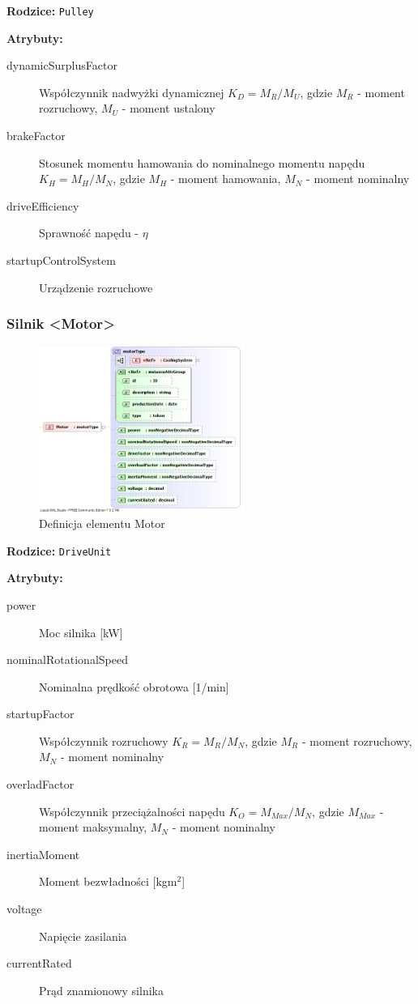 \documentclass[12pt,a4paper]{article}
\begin{document}
\noindent\textbf{Rodzice:} \texttt{Pulley}

\noindent\textbf{Atrybuty:}
\begin{description}
\item[dynamicSurplusFactor] Współczynnik nadwyżki dynamicznej $K_D = M_R/M_U$,
  gdzie $M_R$ - moment rozruchowy, $M_U$ - moment ustalony
\item[brakeFactor] Stosunek momentu hamowania do nominalnego momentu napędu $K_H
  = M_H/M_N$, gdzie $M_H$ - moment hamowania, $M_N$ - moment nominalny
\item[driveEfficiency] Sprawność napędu - $\eta$
\item[startupControlSystem] Urządzenie rozruchowe
\end{description}

\subsubsection{Silnik <Motor>}

\begin{figure}[H]
  \centering
  \includegraphics[width=0.6\textwidth]{png/liquid/Motor}
  \caption{Definicja elementu Motor}
  \label{fig:motor-xsd}
\end{figure}

\noindent\textbf{Rodzice:} \texttt{DriveUnit}

\noindent\textbf{Atrybuty:}
\begin{description}
\item[power] Moc silnika [kW]
\item[nominalRotationalSpeed] Nominalna prędkość obrotowa [1/min]
\item[startupFactor] Współczynnik rozruchowy $K_R = M_R/M_N$,
	gdzie $M_R$ - moment rozruchowy, $M_N$ - moment nominalny
\item[overladFactor] Współczynnik przeciążalności napędu $K_O = M_{Max}/M_N$,
	gdzie $M_{Max}$ - moment maksymalny, $M_N$ - moment nominalny
\item[inertiaMoment] Moment bezwładności [kgm$^2$]
\item[voltage] Napięcie zasilania
\item[currentRated] Prąd znamionowy silnika
\end{description}
\end{document}
